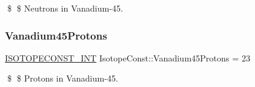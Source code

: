 \$ \$ Neutrons in Vanadium-\/45. \mbox{\label{group___isotope_const-_vanadium-_v45_ga9902e16319960ba65a0b8c1c4a7a1dbc}} 
\subsubsection{\texorpdfstring{Vanadium45\+Protons}{Vanadium45Protons}}
{\footnotesize\ttfamily \mbox{\hyperlink{group___isotope_const-_macros_ga5f18360b3e99483a35c32d789e62621c}{I\+S\+O\+T\+O\+P\+E\+C\+O\+N\+S\+T\+\_\+\+I\+NT}} Isotope\+Const\+::\+Vanadium45\+Protons = 23}

\$ \$ Protons in Vanadium-\/45. 